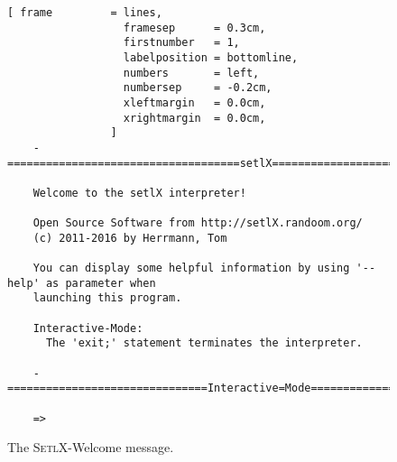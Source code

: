 \begin{figure}[!ht]
\centering
\begin{Verbatim}[ frame         = lines, 
                  framesep      = 0.3cm, 
                  firstnumber   = 1,
                  labelposition = bottomline,
                  numbers       = left,
                  numbersep     = -0.2cm,
                  xleftmargin   = 0.0cm,
                  xrightmargin  = 0.0cm,
                ]
    -====================================setlX=============================v2.5.0=-
    
    Welcome to the setlX interpreter!
    
    Open Source Software from http://setlX.randoom.org/
    (c) 2011-2016 by Herrmann, Tom
    
    You can display some helpful information by using '--help' as parameter when
    launching this program.
    
    Interactive-Mode:
      The 'exit;' statement terminates the interpreter.
    
    -===============================Interactive=Mode==============================-
    
    => 
\end{Verbatim}
\vspace*{-0.3cm}
\caption{The \textsc{SetlX}-Welcome message.}
\label{fig:setlx}
\end{figure}

